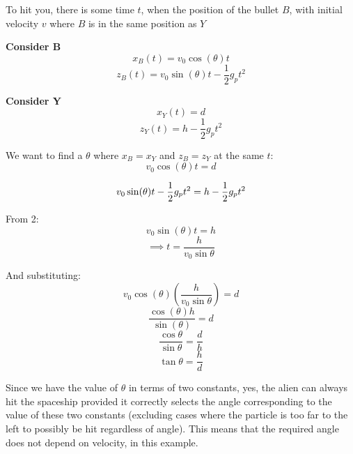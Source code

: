 To hit you, there is some time $t$, when the position of the bullet $B$, with initial velocity $v$ where $B$ is in the same position as $Y$

\textbf{Consider B}
\[
    x_B(t) = v_0 \cos (\theta)t 
\]
\[
    z_B(t) = v_0 \sin(\theta)t - \frac{1}{2}g_p t^2
\]

\textbf{Consider Y}
\[
    x_Y(t) = d
\]
\[
    z_Y(t) = h - \frac{1}{2}g_p t^2
\]

We want to find a $\theta$ where $x_B = x_Y$ and $z_B = z_Y$ at the same $t$:
\begin{equation}
    v_0 \cos(\theta)t = d
\end{equation}

\begin{equation}
    v_0 \sin(\theta)t - \frac{1}{2}g_p t^2 = h - \frac{1}{2}g_p t^2\\
\end{equation}

From 2:
\[
    v_0 \sin(\theta)t = h
\]
\[
    \implies t = \frac{h}{v_0 \sin \theta}
\]

And substituting:
\[
    v_0 \cos(\theta) \left(\frac{h}{v_0 \sin \theta}\right) = d
\]
\[
    \frac{\cos(\theta) h}{\sin(\theta)} = d
\]
\[
    \frac{\cos \theta}{\sin \theta} = \frac{d}{h}
\]
\[
    \tan \theta = \frac{h}{d}
\]


Since we have the value of $\theta$ in terms of two constants, yes, the alien can always hit the spaceship provided it correctly selects the angle corresponding to the value of these two constants (excluding cases where the particle is too far to the left to possibly be hit regardless of angle). This means that the required angle does not depend on velocity, in this example.